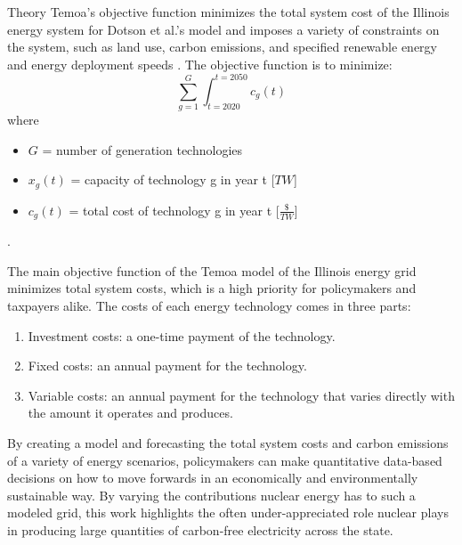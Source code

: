 \documentclass[final]{beamer}
\newlength{\onecolwid}
\newlength{\threecolwid}
\begin{document}
\begin{frame}[t]
\begin{columns}[t,totalwidth=\threecolwid]
\begin{column}{\onecolwid}
\begin{block}{Theory}
Temoa’s objective function minimizes the total system cost of the Illinois energy system for Dotson et al.’s model and imposes a variety of constraints on the system, such as land use, carbon emissions, and specified renewable energy and energy deployment speeds \cite{dotson}. The objective function is to minimize:
	\begin{equation} \label{eq:objective}
	  \sum_{g=1}^{G} \int_{t=2020}^{t=2050}c_g(t)
	\end{equation} where \newline
	\begin{itemize}
	  \item $G$ = number of generation technologies
	  \item $x_g(t)$ = capacity of technology g in year t [$TW$]
	  \item $c_g(t)$ = total cost of technology g in year t [$\frac{\$}{TW}$]
	\end{itemize} \cite{dotson}.

	\vspace{0.7em}
	The main objective function of the Temoa model of the Illinois energy grid minimizes total system costs, which is a high priority for policymakers and taxpayers alike. The costs of each energy technology comes in three parts:

\begin{enumerate}
  \item Investment costs: a one-time payment of the technology.
  \item Fixed costs: an annual payment for the technology.
  \item Variable costs: an annual payment for the technology that varies directly with the amount it operates and produces.
\end{enumerate}
\vspace{0.7em}

By creating a model and forecasting the total system costs and carbon emissions of a variety of energy scenarios, policymakers can make quantitative data-based decisions on how to move forwards in an economically and environmentally sustainable way. By varying the contributions nuclear energy has to such a modeled grid, this work highlights the often under-appreciated role nuclear plays in producing large quantities of carbon-free electricity across the state.



\end{block}
\end{column}
\end{columns}
\end{frame}
\end{document}
